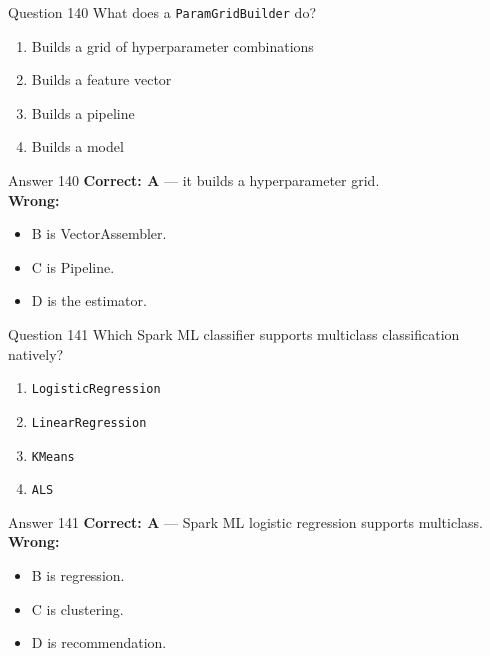 \documentclass[aspectratio=169,11pt]{beamer}
\begin{document}
	\begin{frame}{Question 140}
		What does a \texttt{ParamGridBuilder} do?
		\begin{enumerate}[label=\Alph*.]
			\item Builds a grid of hyperparameter combinations
			\item Builds a feature vector
			\item Builds a pipeline
			\item Builds a model
		\end{enumerate}
	\end{frame}
	\begin{frame}{Answer 140}
		\textbf{Correct: A} --- it builds a hyperparameter grid.\\
		\vspace{0.5em}
		\textbf{Wrong:}
		\begin{itemize}
			\item B is VectorAssembler.
			\item C is Pipeline.
			\item D is the estimator.
		\end{itemize}
	\end{frame}
	
	\begin{frame}{Question 141}
		Which Spark ML classifier supports multiclass classification natively?
		\begin{enumerate}[label=\Alph*.]
			\item \texttt{LogisticRegression}
			\item \texttt{LinearRegression}
			\item \texttt{KMeans}
			\item \texttt{ALS}
		\end{enumerate}
	\end{frame}
	\begin{frame}{Answer 141}
		\textbf{Correct: A} --- Spark ML logistic regression supports multiclass.\\
		\vspace{0.5em}
		\textbf{Wrong:}
		\begin{itemize}
			\item B is regression.
			\item C is clustering.
			\item D is recommendation.
		\end{itemize}
	\end{frame}
	
\end{document}
